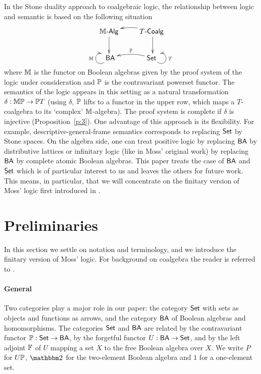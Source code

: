 \documentclass{book}
\begin{document}
In the Stone duality approach to coalgebraic logic, the relationship
between logic and semantic is based on the following situation
\begin{equation}\label{diag:duality}
\xymatrix{
  {\xxviM\textsf{-Alg}}\ar[d] %
  & {T\textsf{-Coalg}}\  \ar@/_/[l]_{} \ar[d]\\
  {\ \xxviBA} \ar@(dl,ul)[]^{\xxviM} %
   & {\xxviSet\ } \ar@/_/[l]_{\xxviPal} \ar@(dr,ur)[]_{T}
   }
\end{equation}
where $\mathbb{M}$ is the functor on Boolean algebras given by the proof
system of the logic under consideration and $\mathbb{P}$ is the
contravariant powerset functor. The semantics of the logic appears in
this setting as a natural transformation $\delta:\mathbb{M}\mathbb{P}\to \mathbb{P} T$
(using $\delta$, $\mathbb{P}$ lifts to a functor in the upper row, which
maps a $T$-coalgebra to its `complex' $\mathbb{M}$-algebra). The proof system
is complete if $\delta$ is injective (Proposition~\ref{p:3}). One
advantage of this approach is its flexibility. For example,
descriptive-general-frame semantics corresponds to replacing $\mathsf{Set}$ by
Stone spaces. On the algebra side, one can treat positive logic by
replacing $\mathsf{BA}$ by distributive lattices or infinitary logic (like in
Moss' original work) by replacing $\mathsf{BA}$ by complete atomic Boolean
algebras. This paper treats the case of $\mathsf{BA}$ and $\mathsf{Set}$ which is of
particular interest to us and leaves the others for future work. This
means, in particular, that we will concentrate on the finitary version
of Moss' logic first introduced in \cite{venema:coalg-aut}.



%
\section{Preliminaries}

In this section we settle on notation and terminology, and we introduce the
finitary version of Moss' logic.
For background on coalgebra the reader is referred to \cite{vene:alge06}.

\paragraph{General}
Two categories play a major role in our paper: the category $\mathsf{Set}$ with
sets as objects and functions as arrows, and the category $\mathsf{BA}$ of Boolean 
algebras and homomorphisms.
The categories $\mathsf{Set}$ and $\mathsf{BA}$ are related by the contravariant functor
$\mathbb{P}: \mathsf{Set}\to\mathsf{BA}$,
by the forgetful functor $U:\mathsf{BA}\to\mathsf{Set}$, and by the left adjoint
$\mathbb{F}$ of $U$ mapping a set $X$ to the free Boolean algebra over
$X$. We write $P$ for $U\mathbb{P}$, $\xxvibbtwo$ for the two-element Boolean
algebra and $1$ for a one-element set.
\end{document}
